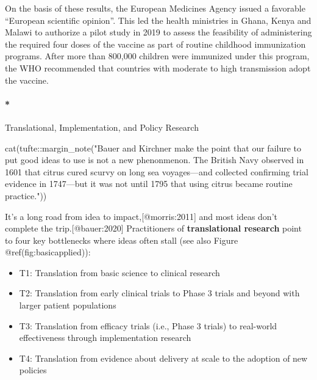 \documentclass[
  letterpaper,
  DIV=11,
  numbers=noendperiod,
  oneside]{scrartcl}
\let\oldparagraph\paragraph
\renewcommand{\paragraph}[1]{\oldparagraph{#1}\mbox{}}
\newenvironment{Shaded}{\begin{snugshade}}{\end{snugshade}}
\newcommand{\FunctionTok}[1]{\textcolor[rgb]{0.28,0.35,0.67}{#1}}
\newcommand{\NormalTok}[1]{\textcolor[rgb]{0.00,0.23,0.31}{#1}}
\newcommand{\SpecialCharTok}[1]{\textcolor[rgb]{0.37,0.37,0.37}{#1}}
\newcommand{\StringTok}[1]{\textcolor[rgb]{0.13,0.47,0.30}{#1}}
\providecommand{\tightlist}{%
  \setlength{\itemsep}{0pt}\setlength{\parskip}{0pt}}\usepackage{longtable,booktabs,array}
\begin{document}
\begin{blackbox}
\vspace{.2cm}

On the basis of these results, the European Medicines Agency issued a
favorable ``European scientific opinion''. This led the health
ministries in Ghana, Kenya and Malawi to authorize a pilot study in 2019
to assess the feasibility of administering the required four doses of
the vaccine as part of routine childhood immunization programs. After
more than 800,000 children were immunized under this program, the WHO
recommended that countries with moderate to high transmission adopt the
vaccine.

\end{blackbox}

\hypertarget{translational-implementation-and-policy-research}{%
\paragraph*{Translational, Implementation, and Policy
Research}\label{translational-implementation-and-policy-research}}

\begin{Shaded}
\begin{Highlighting}[]
\FunctionTok{cat}\NormalTok{(tufte}\SpecialCharTok{::}\FunctionTok{margin\_note}\NormalTok{(}\StringTok{"Bauer and Kirchner make the point that our failure to put good ideas to use is not a new phenonmenon. The British Navy observed in 1601 that citrus cured scurvy on long sea voyages—and collected confirming \textquotesingle{}trial\textquotesingle{} evidence in 1747—but it was not until 1795 that using citrus became routine practice."}\NormalTok{))}
\end{Highlighting}
\end{Shaded}


It's a long road from idea to impact,{[}@morris:2011{]} and most ideas
don't complete the trip.{[}@bauer:2020{]} Practitioners of
\textbf{translational research} point to four key bottlenecks where
ideas often stall (see also Figure @ref(fig:basicapplied)):

\begin{itemize}
\tightlist
\item
  T1: Translation from basic science to clinical research
\item
  T2: Translation from early clinical trials to Phase 3 trials and
  beyond with larger patient populations
\item
  T3: Translation from efficacy trials (i.e., Phase 3 trials) to
  real-world effectiveness through implementation research
\item
  T4: Translation from evidence about delivery at scale to the adoption
  of new policies
\end{itemize}
\end{document}
